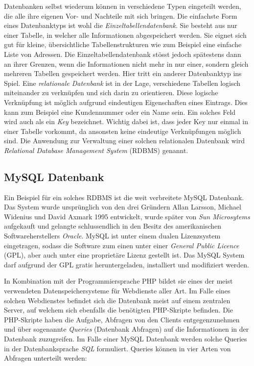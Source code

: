 \documentclass[a4paper,11pt]{report}
\begin{document}
			Datenbanken selbst wiederum können in  verschiedene Typen eingeteilt werden, die alle ihre eigenen Vor- und Nachteile mit sich bringen. Die einfachste Form eines Datenbanktyps ist wohl die \emph{Einzeltabellendatenbank}. Sie besteht aus nur einer Tabelle, in welcher alle Informationen abgespeichert werden. Sie eignet sich gut für kleine, übersichtliche Tabellenstrukturen wie zum Beispiel eine einfache Liste von Adressen. Die Einzeltabellendatenbank stösst jedoch spätestens dann an ihrer Grenzen, wenn die Informationen nicht mehr in nur einer, sondern gleich mehreren Tabellen gespeichert werden. Hier tritt ein anderer Datenbanktyp ins Spiel. Eine \emph{relationale Datenbank} ist in der Lage, verschiedene Tabellen logisch miteinander zu verknüpfen und sich darin zu orientieren. Diese logische Verknüpfung ist möglich aufgrund eindeutigen Eigenschaften eines Eintrags. Dies kann zum Beispiel eine Kundennummer oder ein Name sein. Ein solches Feld wird auch als ein \emph{Key} bezeichnet. Wichtig dabei ist, dass jeder Key nur einmal in einer Tabelle vorkommt, da ansonsten keine eindeutige Verknüpfungen möglich sind. Die Anwendung zur Verwaltung einer solchen relationalen Datenbank wird \emph{Relational Database Management System} (RDBMS) genannt. \cite[S. 745 - 751]{IT-Handbuch}

				\subsection{MySQL Datenbank}
				Ein Beispiel für ein solches RDBMS ist die weit verbreitete MySQL Datenbank. Das System wurde ursprünglich von den drei Gründern Allan Larsson, Michael Widenius und David Axmark 1995 entwickelt, wurde später von \emph{Sun Microsytems} aufgekauft und gelangte schlussendlich in den Besitz des amerikanischen Softwareherstellers \emph{Oracle}. MySQL ist unter einem dualen Lizenzsystem eingetragen, sodass die Software zum einen unter einer \emph{General Public Licence} (GPL), aber auch unter eine proprietäre Lizenz gestellt ist. \cite{tecmint.com} Das MySQL System darf aufgrund der GPL gratis heruntergeladen, installiert und modifiziert werden.
				
				In Kombination mit der Programmiersprache PHP bildet sie eines der meist verwendeten Datenspeichersysteme für Webdienste aller Art. Im Falle eines solchen Webdienstes befindet sich die Datenbank meist auf einem zentralen Server, auf welchem sich ebenfalls die benötigten PHP-Skripte befinden. Die PHP-Skripte haben die Aufgabe, Abfragen von den Clients entgegenzunehmen und über sogenannte \emph{Queries} (Datenbank Abfragen) auf die Informationen in der Datenbank zuzugreifen. Im Falle einer MySQL Datenbank werden solche Queries in der Datenbanksprache \emph{SQL} formuliert. Queries können in vier Arten von Abfragen unterteilt werden: \cite[S. 760]{IT-Handbuch}
				
\end{document}
